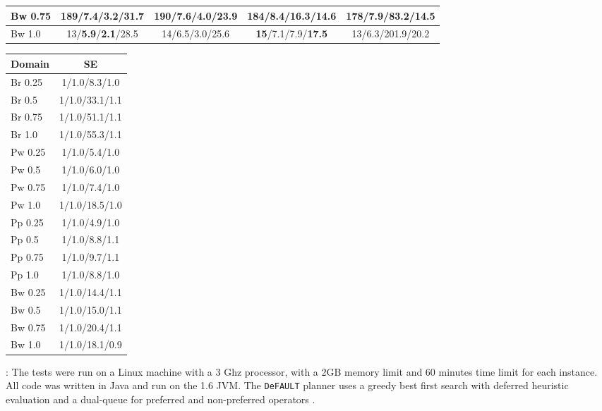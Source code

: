 \documentclass{article}
\def\und#1{\noindent{\bf #1}:}
\def\citep#1{\cite{#1}}
\def\FFRISKY{{\tt DeFAULT}}
\def\default{{\tt DeFAULT}}
\begin{document}
\begin{table*}
\begin{minipage}{5in}
\begin{tabular}{|@{}l@{}|@{}c@{ }c@{ }c@{ }c@{}|}
Bw	0.75	&189/{\bf 7.4}/{\bf 3.2}/31.7 	&{\bf 190}/7.6/4.0/23.9 	&184/8.4/16.3/14.6 	&178/7.9/83.2/{\bf 14.5} 	\\ \hline
Bw	1.0	&13/{\bf 5.9}/{\bf 2.1}/28.5 	&14/6.5/3.0/25.6 	&{\bf 15}/7.1/7.9/{\bf 17.5} 	&13/6.3/201.9/20.2 	\\ \hline
\end{tabular}\caption{\label{tab:questionComp1} Goal-directed KA
Average Performance using \default{}. Bold indicates best performance. (Num
Solved/Num Steps/Time (s)/Questions)}
\end{minipage}
\begin{minipage}{1.75in}
\small\begin{tabular}{|l|c|}\hline
Domain & SE  \\ \hline
Br	0.25	&1/1.0/8.3/1.0 	\\ \hline
Br	0.5	&1/1.0/33.1/1.1 	\\ \hline
Br	0.75	&1/1.0/51.1/1.1 	\\ \hline
Br	1.0	&1/1.0/55.3/1.1 	\\ \hline
\hline
Pw	0.25	&1/1.0/5.4/1.0 	\\ \hline
Pw	0.5	&1/1.0/6.0/1.0 	\\ \hline
Pw	0.75	&1/1.0/7.4/1.0 	\\ \hline
Pw	1.0	&1/1.0/18.5/1.0 	\\ \hline
\hline
Pp	0.25	&1/1.0/4.9/1.0 	\\ \hline
Pp	0.5	&1/1.0/8.8/1.1 	\\ \hline
Pp	0.75	&1/1.0/9.7/1.1 	\\ \hline
Pp	1.0	&1/1.0/8.8/1.0 	\\ \hline
\hline
Bw	0.25	&1/1.0/14.4/1.1 	\\ \hline
Bw	0.5	&1/1.0/15.0/1.1 	\\ \hline
Bw	0.75	&1/1.0/20.4/1.1 	\\ \hline
Bw	1.0	&1/1.0/18.1/0.9 	\\ \hline
\end{tabular}\caption{\label{tab:rpComp} Plan versus
Relaxed Plan Ratio in SE.}
\end{minipage}
\end{table*}


\und{Test Setup} The tests were run on a Linux machine with a 3 Ghz processor,
with a  2GB memory limit and 60 minutes time limit for each instance. All code
was written in Java and run on the 1.6 JVM. The \FFRISKY{} planner uses a greedy
best first search with deferred heuristic evaluation and a dual-queue for
preferred and non-preferred operators \citep{DBLP:journals/jair/Helmert06}. 
\end{document}
